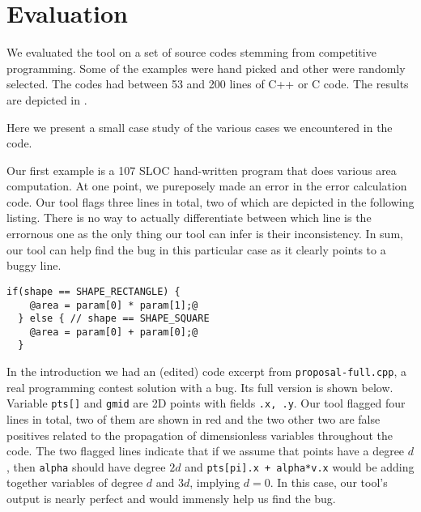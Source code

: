 \documentclass[12pt]{article}
\begin{document}
\section{Evaluation}

We evaluated the tool on a set of source codes stemming from competitive programming. Some of the examples were hand picked and other were randomly selected. The codes had between 53 and 200 lines of C++ or C code. The results are depicted in .

\begin{table}[H]
  \caption{Evaluation results}
  \label{table:eval-results}
\end{table}

Here we present a small case study of the various cases we encountered in the code.

Our first example is a 107 SLOC hand-written program that does various area computation.
At one point, we pureposely made an error in the error calculation code.
Our tool flags three lines in total, two of which are depicted in the following listing.
There is no way to actually differentiate between which line is the errornous one as the
only thing our tool can infer is their inconsistency.
In sum, our tool can help find the bug in this
particular case as it clearly points to a buggy line.

\begin{lstlisting}[label=quadrilateral.c]
  if(shape == SHAPE_RECTANGLE) {
    @area = param[0] * param[1];@
  } else { // shape == SHAPE_SQUARE
    @area = param[0] + param[0];@
  }
\end{lstlisting}

In the introduction we had an (edited) code excerpt from \texttt{proposal-full.cpp},
a real programming contest solution with a bug.
Its full version is shown below.
Variable \texttt{pts[]} and \texttt{gmid} are 2D points with fields \texttt{.x, .y}.
Our tool flagged four lines in total, two of them are shown in red and the two other
two are false positives related to the propagation of dimensionless variables throughout the code.
The two flagged lines indicate that if we assume that points have a degree $d$,
then \texttt{alpha} should have degree $2d$ and \texttt{pts[pi].x + alpha*v.x} would
be adding together variables of degree $d$ and $3d$, implying $d = 0$.
In this case, our tool's output is nearly perfect and would immensly help us find the bug.
\end{document}
